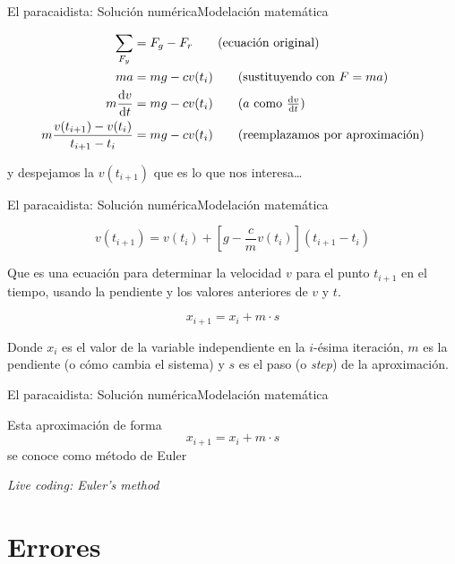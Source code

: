 \documentclass[spanish, c]{beamer}
\begin{document}
\begin{frame}{El paracaidista: Solución numérica}{Modelación matemática}

    \begin{align*}
        \sum_{F_y} & = F_g - F_r \tag{ecuación original} \\
        ma  & = mg - cv(t_i) \tag{sustituyendo con $F=ma$} \\
        m\dv{v}{t} & = mg - cv(t_i) \tag{$a$ como $\dv{v}{t}$} \\
        m\frac{v(t_{i+1}) - v(t_i)}{t_{i+1} - t_i} & = mg - cv(t_i) \tag{reemplazamos por aproximación}
    \end{align*}

    y despejamos la $v(t_{i+1})$ que es lo que nos interesa\dots 

\end{frame}

\begin{frame}{El paracaidista: Solución numérica}{Modelación matemática}

    $$v(t_{i+1}) = v(t_i) + \left[ g - \frac{c}{m} v(t_i)\right](t_{i+1} - t_i)$$

    Que es una ecuación para determinar la velocidad $v$ para el punto $t_{i+1}$ en el tiempo, usando la pendiente y los valores anteriores de $v$ y $t$. \pause

    $$x_{i+1} = x_i + m \cdot s$$

    \bigskip

    Donde $x_i$ es el valor de la variable independiente en la $i$-ésima iteración, $m$ es la pendiente (o cómo cambia el sistema) y $s$ es el paso (o \textit{step}) de la aproximación.

\end{frame}

\begin{frame}{El paracaidista: Solución numérica}{Modelación matemática}
    \begin{center}
        \Large
        Esta aproximación de forma
        $$x_{i+1} = x_i + m \cdot s$$
        se conoce como \alert{método de Euler}
    \end{center} \pause

    \begin{center}
        \textit{Live coding: Euler's method}
    \end{center}
\end{frame}

\section{Errores}
\end{document}
